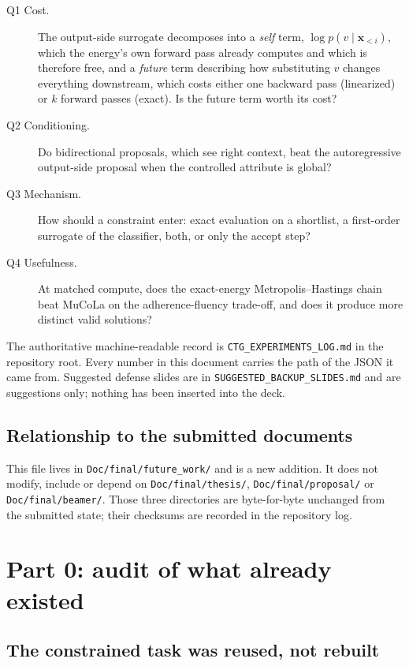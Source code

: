 \documentclass[11pt,a4paper]{article}
\newcommand{\vx}{\bm{x}}
\newcommand{\file}[1]{\texttt{\small #1}}
\begin{document}
\begin{description}
\item[Q1 Cost.] The output-side surrogate decomposes into a \emph{self} term,
  $\log p(v \mid \vx_{<i})$, which the energy's own forward pass already computes and
  which is therefore free, and a \emph{future} term describing how substituting $v$
  changes everything downstream, which costs either one backward pass (linearized) or
  $k$ forward passes (exact). Is the future term worth its cost?
\item[Q2 Conditioning.] Do bidirectional proposals, which see right context, beat the
  autoregressive output-side proposal when the controlled attribute is global?
\item[Q3 Mechanism.] How should a constraint enter: exact evaluation on a shortlist, a
  first-order surrogate of the classifier, both, or only the accept step?
\item[Q4 Usefulness.] At matched compute, does the exact-energy Metropolis--Hastings
  chain beat MuCoLa on the adherence-fluency trade-off, and does it produce more
  distinct valid solutions?
\end{description}

The authoritative machine-readable record is \file{CTG\_EXPERIMENTS\_LOG.md} in the
repository root. Every number in this document carries the path of the JSON it came
from. Suggested defense slides are in \file{SUGGESTED\_BACKUP\_SLIDES.md} and are
suggestions only; nothing has been inserted into the deck.

\subsection{Relationship to the submitted documents}

This file lives in \file{Doc/final/future\_work/} and is a new addition. It does not
modify, include or depend on \file{Doc/final/thesis/}, \file{Doc/final/proposal/} or
\file{Doc/final/beamer/}. Those three directories are byte-for-byte unchanged from the
submitted state; their checksums are recorded in the repository log.

\section{Part 0: audit of what already existed}

\subsection{The constrained task was reused, not rebuilt}
\end{document}
